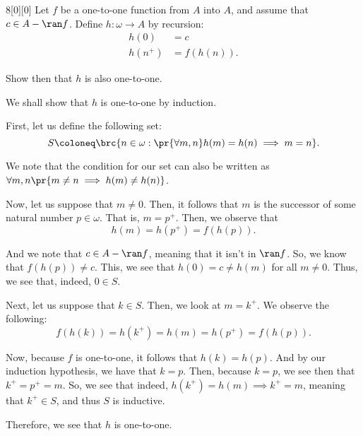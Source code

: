\documentclass{article}
\begin{document}
\begin{hw}{8}[0][0]
	Let $f$ be a one-to-one function from $A$ into $A$, and assume that $c \in A - \ran f$. Define $h : \omega \rightarrow A$ by recursion:
	\begin{align*}
		h(0) &= c \\
		h(n^{+}) &= f(h(n)).
	\end{align*}

	Show then that $h$ is also one-to-one.
\end{hw}
\begin{solution}
	We shall show that $h$ is one-to-one by induction.
	
	First, let us define the following set:
	\begin{equation*}
		S \coloneq \brc{n \in \omega : \pr{\forall m, n} h(m) = h(n) \implies m = n}.
	\end{equation*}

	We note that the condition for our set can also be written as $\forall m, n \pr{m \neq n \implies h(m) \neq h(n)}$.

	Now, let us suppose that $m \neq 0$. Then, it follows that $m$ is the successor of some natural number $p \in \omega$. That is, $m = p^{+}$. Then, we observe that
	\begin{equation*}
		h(m) = h(p^{+}) = f(h(p)).
	\end{equation*}

	And we note that $c \in A - \ran f$, meaning that it isn't in $\ran f$. So, we know that $f(h(p)) \neq c$. This, we see that $h(0) = c \neq h(m)$ for all $m \neq 0$. Thus, we see that, indeed, $0 \in S$.
	
	Next, let us suppose that $k \in S$. Then, we look at $m = k^{+}$. We observe the following:
	\begin{equation*}
		f(h(k)) = h(k^{+}) = h(m) = h(p^{+}) = f(h(p)).
	\end{equation*}

	Now, because $f$ is one-to-one, it follows that $h(k) = h(p)$. And by our induction hypothesis, we have that $k = p$. Then, because $k = p$, we see then that $k^{+} = p^{+} = m$. So, we see that indeed, $h(k^{+}) = h(m) \implies k^{+} = m$, meaning that $k^{+} \in S$, and thus $S$ is inductive.
	
	Therefore, we see that $h$ is one-to-one.
\end{solution}
\end{document}

